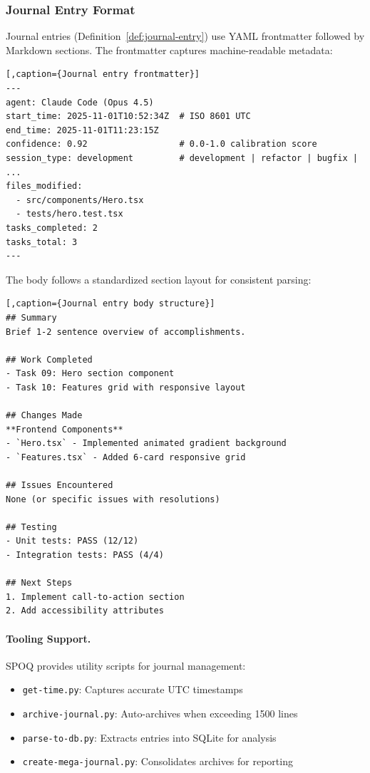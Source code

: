 \needspace{4cm}
\subsubsection{Journal Entry Format}

Journal entries (Definition~\ref{def:journal-entry}) use YAML frontmatter
followed by Markdown sections. The frontmatter captures machine-readable
metadata:

\begin{lstlisting}[,caption={Journal entry frontmatter}]
---
agent: Claude Code (Opus 4.5)
start_time: 2025-11-01T10:52:34Z  # ISO 8601 UTC
end_time: 2025-11-01T11:23:15Z
confidence: 0.92                  # 0.0-1.0 calibration score
session_type: development         # development | refactor | bugfix | ...
files_modified:
  - src/components/Hero.tsx
  - tests/hero.test.tsx
tasks_completed: 2
tasks_total: 3
---
\end{lstlisting}

\needspace{14cm}
The body follows a standardized section layout for consistent parsing:

\begin{lstlisting}[,caption={Journal entry body structure}]
## Summary
Brief 1-2 sentence overview of accomplishments.

## Work Completed
- Task 09: Hero section component
- Task 10: Features grid with responsive layout

## Changes Made
**Frontend Components**
- `Hero.tsx` - Implemented animated gradient background
- `Features.tsx` - Added 6-card responsive grid

## Issues Encountered
None (or specific issues with resolutions)

## Testing
- Unit tests: PASS (12/12)
- Integration tests: PASS (4/4)

## Next Steps
1. Implement call-to-action section
2. Add accessibility attributes
\end{lstlisting}

\paragraph{Tooling Support.}
SPOQ provides utility scripts for journal management:
\begin{itemize}
    \item \texttt{get-time.py}: Captures accurate UTC timestamps
    \item \texttt{archive-journal.py}: Auto-archives when exceeding 1500 lines
    \item \texttt{parse-to-db.py}: Extracts entries into SQLite for analysis
    \item \texttt{create-mega-journal.py}: Consolidates archives for reporting
\end{itemize}

